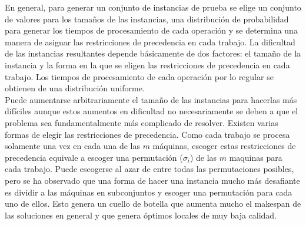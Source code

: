 %
En general, para generar un conjunto de instancias de prueba se elige un conjunto de valores para los tamaños de las instancias, una distribución de probabilidad para generar los tiempos de procesamiento de cada operación y se determina una manera de asignar las restricciones de precedencia en cada trabajo.
%
La dificultad de las instancias resultantes depende básicamente de dos factores: el tamaño de la instancia y la forma en la que se eligen las restricciones de precedencia en cada trabajo. Los tiempos de procesamiento de cada operación por lo regular se obtienen de una distribución uniforme.\\
%
Puede aumentarse arbitrariamente el tamaño de las instancias para hacerlas más difíciles aunque estos aumentos en dificultad no necesariamente se deben a que el problema sea fundamentalmente más complicado de resolver.
%
Existen varias formas de elegir las restricciones de precedencia. Como cada trabajo se procesa solamente una vez en cada una de las $m$ máquinas, escoger estas restricciones de precedencia equivale a escoger una permutación ($\sigma_i$) de las $m$ maquinas para cada trabajo. Puede escogerse al azar de entre todas las  permutaciones posibles, pero se ha observado que una forma de hacer una instancia mucho más desafiante es dividir a las máquinas en subconjuntos y escoger una permutación para cada uno de ellos. Esto genera un cuello de botella que aumenta mucho el makespan de las soluciones en general y que genera óptimos locales de muy baja calidad. \\

